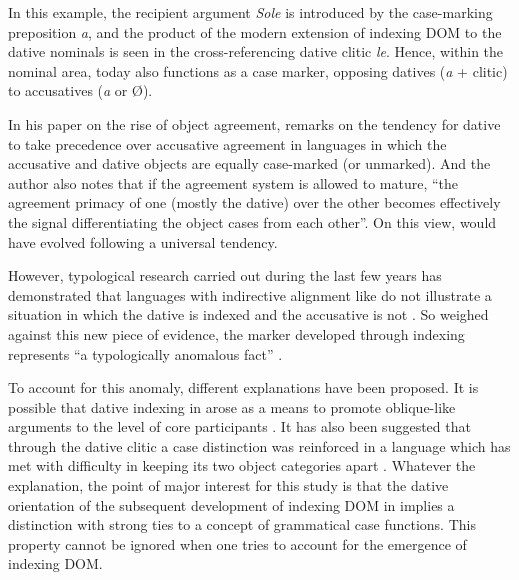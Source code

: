 \documentclass[output=paper]{LSP/langsci}
\begin{document}

In this example, the recipient argument \textit{Sole} is introduced by the case-marking preposition \textit{a}, and the product of the modern extension of indexing DOM to the dative nominals is seen in the cross-referencing dative clitic \textit{le}. Hence, within the nominal area,  today also functions as a case marker, opposing datives (\textit{a} + clitic) to accusatives (\textit{a} or Ø).

 In his paper on the rise of object agreement, \citet[165]{Givon1976Topic} remarks on the tendency for dative to take precedence over accusative agreement in languages in which the accusative and dative objects are equally case-marked (or unmarked). And the author also notes \citep[169]{Givon1976Topic} that if the agreement system is allowed to mature, “the agreement primacy of one (mostly the dative) over the other becomes effectively the signal differentiating the object cases from each other”. On this view,  would have evolved following a universal tendency.

 However, typological research carried out during the last few years has demonstrated that languages with indirective alignment like  do not illustrate a situation in which the dative is indexed and the accusative is not \citep[12]{Haspelmath2005Argument}. So weighed against this new piece of evidence, the  marker  developed through indexing represents “a typologically anomalous fact” \citep[232]{Garcia2015Variable}.

 To account for this anomaly, different explanations have been proposed. It is possible that dative indexing in  arose as a means to promote oblique-like arguments to the level of core participants \citep[232–233]{Garcia2015Variable}. It has also been suggested that through the dative clitic a case distinction was reinforced in a language which has met with difficulty in keeping its two object categories apart \citep{Melisetal2009Interplay}. Whatever the explanation, the point of major interest for this study is that the dative orientation of the subsequent development of indexing DOM in  implies a distinction with strong ties to a concept of grammatical case functions. This property cannot be ignored when one tries to account for the emergence of  indexing DOM. 
\end{document}
